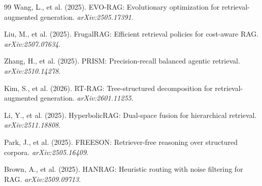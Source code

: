 \documentclass[11pt,a4paper]{article}
\begin{document}
\begin{thebibliography}{99}
Wang, L., et al. (2025).
EVO-RAG: Evolutionary optimization for retrieval-augmented generation.
\textit{arXiv:2505.17391}.

Liu, M., et al. (2025).
FrugalRAG: Efficient retrieval policies for cost-aware RAG.
\textit{arXiv:2507.07634}.

Zhang, H., et al. (2025).
PRISM: Precision-recall balanced agentic retrieval.
\textit{arXiv:2510.14278}.

Kim, S., et al. (2026).
RT-RAG: Tree-structured decomposition for retrieval-augmented generation.
\textit{arXiv:2601.11255}.

Li, Y., et al. (2025).
HyperbolicRAG: Dual-space fusion for hierarchical retrieval.
\textit{arXiv:2511.18808}.

Park, J., et al. (2025).
FREESON: Retriever-free reasoning over structured corpora.
\textit{arXiv:2505.16409}.

Brown, A., et al. (2025).
HANRAG: Heuristic routing with noise filtering for RAG.
\textit{arXiv:2509.09713}.

\end{thebibliography}
\end{document}
